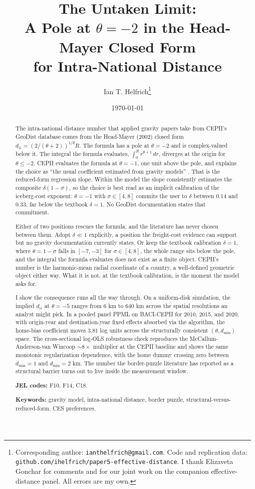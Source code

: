 \documentclass[11pt, letterpaper]{article}
\title{\large The Untaken Limit:\\
\Large A Pole at $\theta = -2$ in the Head-Mayer Closed Form\\
\Large for Intra-National Distance}
\author{Ian T. Helfrich\thanks{%
Corresponding author: \texttt{ianthelfrich@gmail.com}.
Code and replication data:
\texttt{github.com/ihelfrich/paper5-effective-distance}.
I thank Elizaveta Gonchar for comments and for our joint work on the
companion effective-distance panel. All errors are my own.}}
\affil{Georgia Institute of Technology}
\date{\today}
\theoremstyle{definition}
\newcommand{\dii}{d_{ii}}
\begin{document}
\maketitle

\begin{abstract}
\noindent
The intra-national distance number that applied gravity papers take
from CEPII's GeoDist database comes from the Head-Mayer (2002) closed form
$\dii = (2/(\theta+2))^{1/\theta} R$. The formula has a pole at
$\theta = -2$ and is complex-valued below it. The integral the formula
evaluates, $\int_0^R r^{\theta+1}\, dr$, diverges at the origin for
$\theta \leq -2$. CEPII evaluates the formula at $\theta = -1$, one unit
above the pole, and explains the choice as ``the usual coefficient
estimated from gravity models'' \citep{mayer_zignago_2011}. That is the
reduced-form regression slope. Within the model the slope consistently
estimates the composite $\delta(1-\sigma)$, so the choice is best read
as an implicit calibration of the iceberg-cost exponent: $\theta = -1$
with $\sigma \in [4,8]$ commits the user to $\delta$ between $0.14$
and $0.33$, far below the textbook $\delta = 1$. No GeoDist
documentation states that commitment.

Either of two positions rescues the formula, and the literature has
never chosen between them. Adopt $\delta \ll 1$ explicitly, a position
the freight-cost evidence can support but no gravity documentation
currently states. Or keep the textbook calibration $\delta = 1$, where
$\theta = 1-\sigma$ falls in $[-7,-3]$ for $\sigma \in [4,8]$, the
whole range sits below the pole, and the integral the formula
evaluates does not exist as a finite object. CEPII's number is the
harmonic-mean radial coordinate of a country, a well-defined geometric
object either way. What it is not, at the textbook calibration, is the
moment the model asks for.

I show the consequence runs all the way through. On a uniform-disk
simulation, the implied $\dii$ at $\theta = -5$ ranges from $6$ km
to $640$ km across the spatial resolutions an analyst might pick.
In a pooled panel PPML on BACI-CEPII for 2010, 2015, and 2020, with
origin-year and destination-year fixed effects absorbed via the
\citet{correia_guimaraes_zylkin_2020} algorithm, the home-bias
coefficient moves $3.81$ log units across the structurally consistent
$(\theta, d_{\min})$ space. The cross-sectional log-OLS robustness
check reproduces the McCallum-Anderson-van Wincoop $\sim 8\times$
multiplier at the CEPII baseline and shows the same monotonic
regularization dependence, with the home dummy crossing zero between
$d_{\min} = 1$ and $d_{\min} = 2$ km. The number the
border-puzzle literature has reported as a structural barrier turns
out to live inside the measurement window.

\medskip

\noindent \textbf{JEL codes:} F10, F14, C18.

\noindent \textbf{Keywords:} gravity model, intra-national distance,
border puzzle, structural-versus-reduced-form, CES preferences.
\end{abstract}
\end{document}
